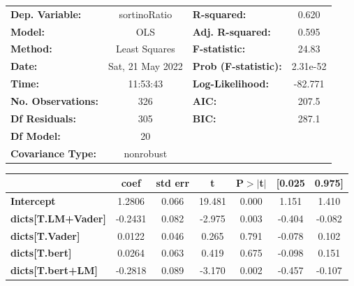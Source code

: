 \begin{center}
\begin{tabular}{lclc}
\toprule
\textbf{Dep. Variable:}              &   sortinoRatio   & \textbf{  R-squared:         } &     0.620   \\
\textbf{Model:}                      &       OLS        & \textbf{  Adj. R-squared:    } &     0.595   \\
\textbf{Method:}                     &  Least Squares   & \textbf{  F-statistic:       } &     24.83   \\
\textbf{Date:}                       & Sat, 21 May 2022 & \textbf{  Prob (F-statistic):} &  2.31e-52   \\
\textbf{Time:}                       &     11:53:43     & \textbf{  Log-Likelihood:    } &   -82.771   \\
\textbf{No. Observations:}           &         326      & \textbf{  AIC:               } &     207.5   \\
\textbf{Df Residuals:}               &         305      & \textbf{  BIC:               } &     287.1   \\
\textbf{Df Model:}                   &          20      & \textbf{                     } &             \\
\textbf{Covariance Type:}            &    nonrobust     & \textbf{                     } &             \\
\bottomrule
\end{tabular}
\begin{tabular}{lcccccc}
                                     & \textbf{coef} & \textbf{std err} & \textbf{t} & \textbf{P$> |$t$|$} & \textbf{[0.025} & \textbf{0.975]}  \\
\midrule
\textbf{Intercept}                   &       1.2806  &        0.066     &    19.481  &         0.000        &        1.151    &        1.410     \\
\textbf{dicts[T.LM+Vader]}           &      -0.2431  &        0.082     &    -2.975  &         0.003        &       -0.404    &       -0.082     \\
\textbf{dicts[T.Vader]}              &       0.0122  &        0.046     &     0.265  &         0.791        &       -0.078    &        0.102     \\
\textbf{dicts[T.bert]}               &       0.0264  &        0.063     &     0.419  &         0.675        &       -0.098    &        0.151     \\
\textbf{dicts[T.bert+LM]}            &      -0.2818  &        0.089     &    -3.170  &         0.002        &       -0.457    &       -0.107     \\

\end{tabular}
\end{center}
